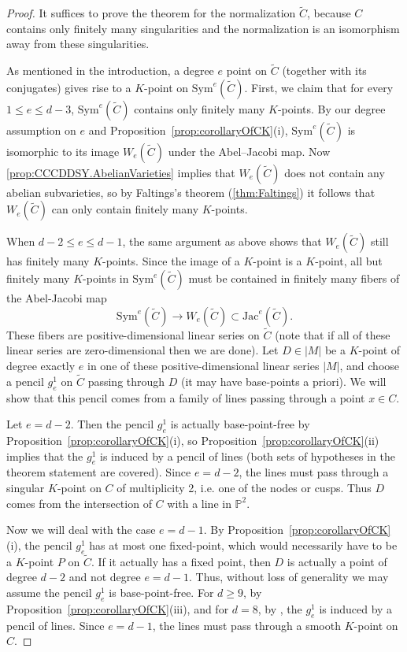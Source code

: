 \documentclass[fontsize=11pt,reqno]{amsart}
\theoremstyle{definition}
\theoremstyle{remark}
\newcommand{\tC}{\widetilde{C}}
\renewcommand{\P}{\mathbb{P}}
\newcommand{\Sym}{\mathrm{Sym}}
\newcommand{\Jac}{\mathrm{Jac}}
\begin{document}
\CCCDDSY*
\begin{proof}
    It suffices to prove the theorem for the normalization $\tC$, because $C$ contains only finitely many singularities and the normalization is an isomorphism away from these singularities.

    As mentioned in the introduction, a degree $e$ point on $\tC$ (together with its conjugates) gives rise to a $K$-point on $\Sym^e(\tC)$. First, we claim that for every $1 \leq e \leq d-3$, $\Sym^{e}(\tC)$ contains only finitely many $K$-points. By our degree assumption on $e$ and Proposition~\ref{prop:corollaryOfCK}(i), $\Sym^e(\tC)$ is isomorphic to its image $W_e(\tC)$ under the Abel--Jacobi map. Now \cref{prop:CCCDDSY.AbelianVarieties} implies that $W_{e}(\tC)$ does not contain any abelian subvarieties, so by Faltings's theorem (\cref{thm:Faltings}) it follows that $W_{e}(\tC)$ can only contain finitely many $K$-points. 

    When $d-2 \leq e \leq d-1$, the same argument as above shows that $W_e(\tC)$ still has finitely many $K$-points. Since the image of a $K$-point is a $K$-point, all but finitely many $K$-points in $\Sym^e(\tC)$ must be contained in finitely many fibers of the Abel-Jacobi map
    \[ \Sym^{e}(\tC) \rightarrow W_{e}(\tC) \subset \Jac^{e}(\tC). \]
    These fibers are positive-dimensional linear series on $\tC$ (note that if all of these linear series are zero-dimensional then we are done). Let $D \in |M|$ be a $K$-point of degree exactly $e$ in one of these positive-dimensional linear series $|M|$, and choose a pencil $g^{1}_{e}$ on $\tC$ passing through $D$ (it may have base-points a priori). We will show that this pencil comes from a family of lines passing through a point $x \in C$.
    
    Let $e = d-2$. Then the pencil $g^{1}_{e}$ is actually base-point-free by Proposition~\ref{prop:corollaryOfCK}(i), so Proposition~\ref{prop:corollaryOfCK}(ii) implies that the $g^{1}_{e}$ is induced by a pencil of lines (both sets of hypotheses in the theorem statement are covered). Since $e = d-2$, the lines must pass through a singular $K$-point on $C$ of multiplicity 2, i.e. one of the nodes or cusps. Thus $D$ comes from the intersection of $C$ with a line in $\P^{2}$.

    Now we will deal with the case $e = d-1$. By Proposition~\ref{prop:corollaryOfCK}(i), the pencil $g^{1}_{e}$ has at most one fixed-point, which would necessarily have to be a $K$-point $P$ on $\tC$. If it actually has a fixed point, then $D$ is actually a point of degree $d-2$ and not degree $e = d-1$. Thus, without loss of generality we may assume the pencil $g^{1}_{e}$ is base-point-free. For $d \geq 9$, by  Proposition~\ref{prop:corollaryOfCK}(iii), and for $d = 8$, by \cite[Theorem 2]{DK94},
    the $g^{1}_{e}$ is induced by a pencil of lines. Since $e = d-1$, the lines must pass through a smooth $K$-point on $C$.
\end{proof}
\end{document}
